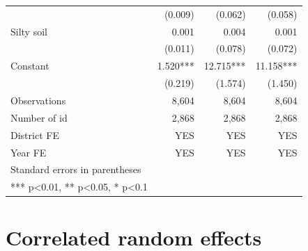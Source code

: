 \documentclass[
]{article}
\begin{document}
\begin{landscape}
\begin{longtable}[t]{lrrr}
 & (0.009) & (0.062) & (0.058)\\
Silty soil & 0.001 & 0.004 & 0.001\\
 & (0.011) & (0.078) & (0.072)\\
Constant & 1.520*** & 12.715*** & 11.158***\\
 & (0.219) & (1.574) & (1.450)\\
Observations & 8,604 & 8,604 & 8,604\\
Number of id & 2,868 & 2,868 & 2,868\\
District FE & YES & YES & YES\\
Year FE & YES & YES & YES\\
Standard errors in parentheses &  &  & \\
*** p<0.01, ** p<0.05, * p<0.1 &  &  & \\*
\end{longtable}
\endgroup{}
\end{landscape}
\newpage

\hypertarget{correlated-random-effects}{%
\section{Correlated random effects}\label{correlated-random-effects}}
\end{document}
